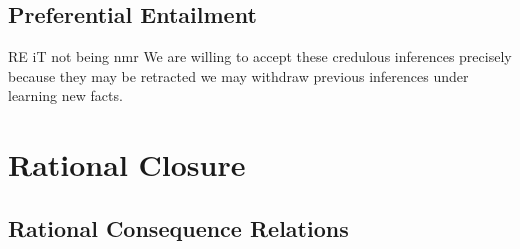 \subsection{Preferential Entailment}

RE iT not being nmr We are willing to accept these credulous inferences precisely because they may be retracted we may
withdraw previous inferences under learning new facts.

\section{Rational Closure}

\subsection{Rational Consequence Relations}